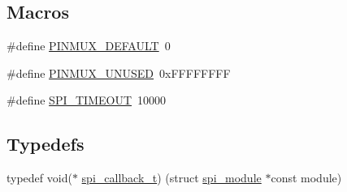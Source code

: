 \subsection*{Macros}
\begin{DoxyCompactItemize}
\item 
\#define \mbox{\hyperlink{group__asfdoc__sam0__sercom__spi__group_gae7bc85650aed61f97fe3d5df9b430456}{P\+I\+N\+M\+U\+X\+\_\+\+D\+E\+F\+A\+U\+LT}}~0
\item 
\#define \mbox{\hyperlink{group__asfdoc__sam0__sercom__spi__group_gaffde9ff712058ef836127e1f3368889e}{P\+I\+N\+M\+U\+X\+\_\+\+U\+N\+U\+S\+ED}}~0x\+F\+F\+F\+F\+F\+F\+FF
\item 
\#define \mbox{\hyperlink{group__asfdoc__sam0__sercom__spi__group_ga0131f2774f4e3dd71567400683b60405}{S\+P\+I\+\_\+\+T\+I\+M\+E\+O\+UT}}~10000
\end{DoxyCompactItemize}
\subsection*{Typedefs}
\begin{DoxyCompactItemize}
\item 
typedef void($\ast$ \mbox{\hyperlink{group__asfdoc__sam0__sercom__spi__group_ga88d771c03a254735de0053be3fa513ca}{spi\+\_\+callback\+\_\+t}}) (struct \mbox{\hyperlink{structspi__module}{spi\+\_\+module}} $\ast$const module)
\end{DoxyCompactItemize}
